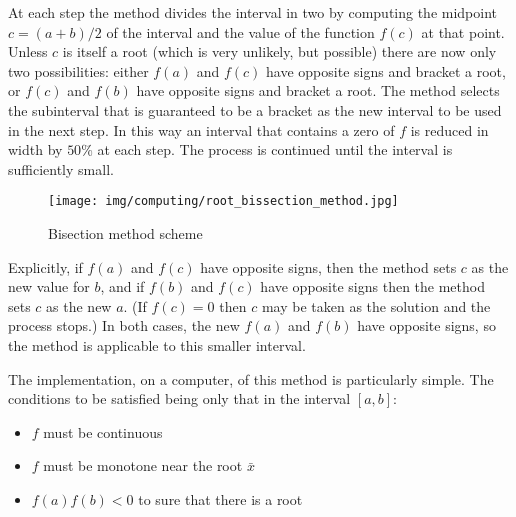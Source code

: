 	At each step the method divides the interval in two by computing the midpoint $c = (a+b) / 2$ of the interval and the value of the function $f(c)$ at that point. Unless $c$ is itself a root (which is very unlikely, but possible) there are now only two possibilities: either $f(a)$ and $f(c)$ have opposite signs and bracket a root, or $f(c)$ and $f(b)$ have opposite signs and bracket a root. The method selects the subinterval that is guaranteed to be a bracket as the new interval to be used in the next step. In this way an interval that contains a zero of $f$ is reduced in width by $50\%$ at each step. The process is continued until the interval is sufficiently small.

	\begin{figure}[H]
		\centering
		\texttt{[image: img/computing/root\_bissection\_method.jpg]}
		\caption{Bisection method scheme}
	\end{figure}

	Explicitly, if $f(a)$ and $f(c)$ have opposite signs, then the method sets $c$ as the new value for $b$, and if $f(b)$ and $f(c)$ have opposite signs then the method sets $c$ as the new $a$. (If $f(c)=0$ then $c$ may be taken as the solution and the process stops.) In both cases, the new $f(a)$ and $f(b)$ have opposite signs, so the method is applicable to this smaller interval.
	
	The implementation, on a computer, of this method is particularly simple. The conditions to be satisfied being only that in the interval $[a,b]$:
	\begin{itemize}
		\item $f$ must be continuous

		\item $f$ must be monotone near the root $\bar{x}$
		
		\item $f(a)f(b)<0$ to sure that there is a root
	\end{itemize}
	
